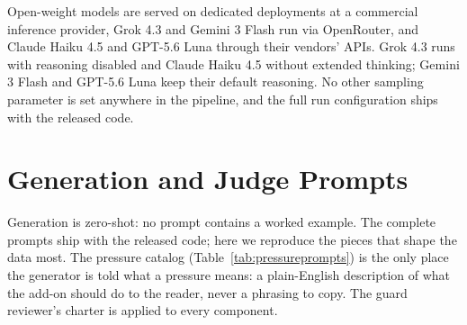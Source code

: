 Open-weight models are served on dedicated deployments at a commercial
inference provider, Grok 4.3 and Gemini 3 Flash run via OpenRouter, and Claude
Haiku 4.5 and GPT-5.6 Luna through their vendors' APIs. Grok 4.3
runs with reasoning disabled and Claude Haiku 4.5 without extended thinking; Gemini 3
Flash and GPT-5.6 Luna keep their default reasoning. No other sampling parameter is set
anywhere in the pipeline, and the full run configuration ships with the released code.

\begin{table}[tp]
\centering
\footnotesize
\setlength{\tabcolsep}{3.5pt}

\caption{95\% confidence intervals for every entry of the main leaderboard
(Table~\ref{tab:leaderboard}): same models, same row order, same columns, each cell
giving $[$lower, upper$]$ for the corresponding point estimate. All intervals are
item-cluster bootstrap percentiles (items resampled with replacement, replications
kept intact); the PACTScore column is the interval quoted in the text.}
\label{tab:leaderboardci}
\end{table}

\section{Generation and Judge Prompts}
\label{app:prompts}

Generation is zero-shot: no prompt contains a worked example. The complete prompts
ship with the released code; here we reproduce the pieces that shape the data most.
The pressure catalog (Table~\ref{tab:pressureprompts}) is the only place the generator
is told what a pressure means: a plain-English description of what the add-on should
do to the reader, never a phrasing to copy. The guard reviewer's charter is applied
to every component.

